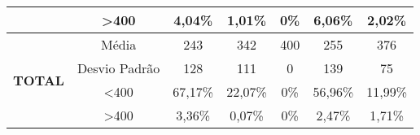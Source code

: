 \begin{table}[]
\begin{tabular}{|c|c|ccccc|}
                                & \textgreater 400 & 4,04\%            & 1,01\%            & 0\%            & 6,06\%            & 2,02\%            \\ \hline
\multirow{4}{*}{\textbf{TOTAL}} & Média            & 243               & 342               & 400               & 255               & 376               \\
                                & Desvio Padrão    & 128               & 111               & 0                 & 139               & 75                \\
                                & \textless 400    & 67,17\%           & 22,07\%           & 0\%            & 56,96\%           & 11,99\%           \\
                                & \textgreater 400 & 3,36\%            & 0,07\%            & 0\%            & 2,47\%            & 1,71\%            \\ \hline
\end{tabular}
\end{table}

